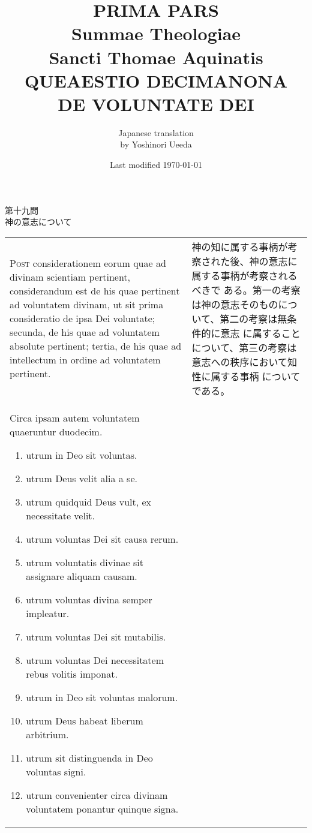 \documentclass[10pt]{jsarticle} %
\title{{\bf PRIMA PARS}\\{\HUGE Summae Theologiae}\\Sancti Thomae
Aquinatis\\{\sffamily QUEAESTIO DECIMANONA}\\DE VOLUNTATE DEI}
\author{Japanese translation\\by Yoshinori {\sc Ueeda}}
\date{Last modified \today}
\begin{document}
\maketitle
\pagestyle{fancy}

\begin{center}
{\Large 第十九問\\神の意志について}
\end{center}

\newpage
\begin{longtable}{p{21em}p{21em}}

{\huge P}{\scshape ost} considerationem eorum quae ad divinam scientiam pertinent,
considerandum est de his quae pertinent ad voluntatem divinam, ut sit
prima consideratio de ipsa Dei voluntate; secunda, de his quae ad
voluntatem absolute pertinent; tertia, de his quae ad intellectum in
ordine ad voluntatem pertinent. 

&

神の知に属する事柄が考察された後、神の意志に属する事柄が考察されるべきで
 ある。第一の考察は神の意志そのものについて、第二の考察は無条件的に意志
 に属することについて、第三の考察は意志への秩序において知性に属する事柄
 についてである。

\\


Circa ipsam autem voluntatem quaeruntur
duodecim. 

\begin{enumerate}
 \item utrum in Deo sit voluntas.
 \item utrum Deus velit alia a se.
 \item utrum quidquid Deus vult, ex necessitate velit.
 \item utrum voluntas Dei sit causa rerum.
 \item utrum voluntatis divinae sit assignare aliquam causam.
 \item utrum voluntas divina semper impleatur.
 \item utrum voluntas Dei sit mutabilis.
 \item utrum voluntas Dei necessitatem rebus volitis imponat.
 \item utrum in Deo sit voluntas malorum.
 \item utrum Deus habeat liberum arbitrium.
 \item utrum sit distinguenda in Deo voluntas signi.
 \item utrum convenienter circa divinam voluntatem ponantur quinque signa.
\end{enumerate}
 

\end{longtable}
\end{document}
